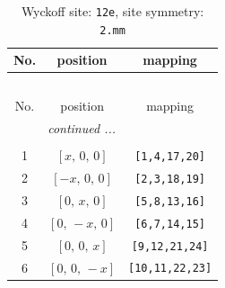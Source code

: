\documentclass[fleqn,8pt]{jsarticle}
\begin{document}
\renewcommand{\arraystretch}{1.2}
\begin{longtable}{ccc}
\caption{Wyckoff site: {\tt 12e}, site symmetry: {\tt 2.mm}}
 \\
 \hline \hline
No. & position & mapping \\ \hline \endfirsthead

\multicolumn{2}{l}{\tablename\ \thetable{}} \\
 \hline \hline
No. & position & mapping \\ \hline \endhead

 \hline \hline
\multicolumn{2}{r}{\footnotesize\it continued ...} \\ \endfoot

 \hline \hline
\multicolumn{2}{r}{} \\ \endlastfoot

1 & $\left[ x,\, 0,\, 0 \right]$ & {\tt [1,4,17,20]} \\ \hline
2 & $\left[ - x,\, 0,\, 0 \right]$ & {\tt [2,3,18,19]} \\ \hline
3 & $\left[ 0,\, x,\, 0 \right]$ & {\tt [5,8,13,16]} \\ \hline
4 & $\left[ 0,\, - x,\, 0 \right]$ & {\tt [6,7,14,15]} \\ \hline
5 & $\left[ 0,\, 0,\, x \right]$ & {\tt [9,12,21,24]} \\ \hline
6 & $\left[ 0,\, 0,\, - x \right]$ & {\tt [10,11,22,23]} \\
\end{longtable}
\renewcommand{\arraystretch}{1.2}
\end{document}
